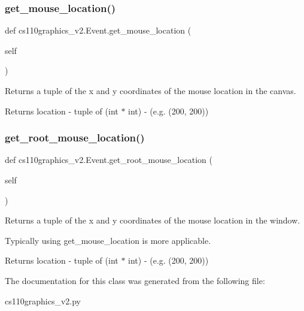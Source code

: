 \subsubsection{\texorpdfstring{get\_mouse\_location()}{get\_mouse\_location()}}
{\footnotesize\ttfamily def cs110graphics\+\_\+v2.\+Event.\+get\+\_\+mouse\+\_\+location (\begin{DoxyParamCaption}\item[{}]{self }\end{DoxyParamCaption})}



Returns a tuple of the x and y coordinates of the mouse location in the canvas. 

\begin{DoxyReturn}{Returns}
location -\/ tuple of (int $\ast$ int) -\/ (e.\+g. (200, 200)) 
\end{DoxyReturn}
\mbox{\label{classcs110graphics__v2_1_1Event_a138c802fe5378ed103a8c090b7435f4c}} 
\subsubsection{\texorpdfstring{get\_root\_mouse\_location()}{get\_root\_mouse\_location()}}
{\footnotesize\ttfamily def cs110graphics\+\_\+v2.\+Event.\+get\+\_\+root\+\_\+mouse\+\_\+location (\begin{DoxyParamCaption}\item[{}]{self }\end{DoxyParamCaption})}



Returns a tuple of the x and y coordinates of the mouse location in the window. 

Typically using get\+\_\+mouse\+\_\+location is more applicable. \begin{DoxyReturn}{Returns}
location -\/ tuple of (int $\ast$ int) -\/ (e.\+g. (200, 200)) 
\end{DoxyReturn}


The documentation for this class was generated from the following file\+:\begin{DoxyCompactItemize}
\item 
cs110graphics\+\_\+v2.\+py\end{DoxyCompactItemize}
